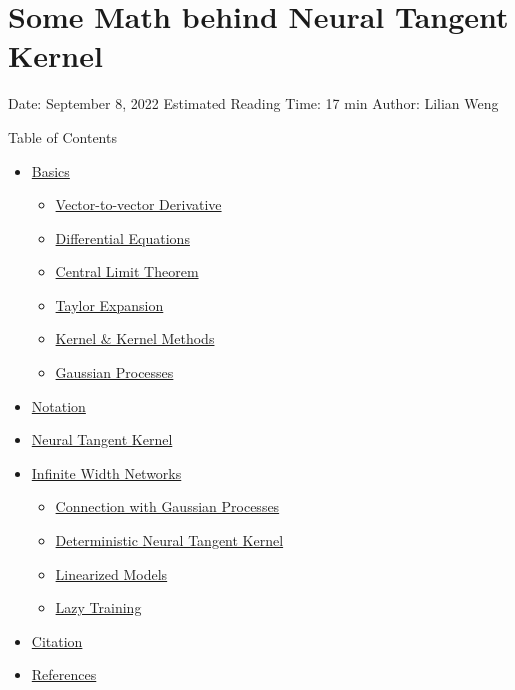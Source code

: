 \section{Some Math behind Neural Tangent Kernel}\label{some-math-behind-neural-tangent-kernel}

Date: September 8, 2022 \textbar{} Estimated Reading Time: 17 min \textbar{} Author: Lilian Weng

{Table of Contents}

\begin{itemize}
\tightlist
\item
  \hyperref[basics]{Basics}

  \begin{itemize}
  \tightlist
  \item
    \hyperref[vector-to-vector-derivative]{Vector-to-vector Derivative}
  \item
    \hyperref[differential-equations]{Differential Equations}
  \item
    \hyperref[central-limit-theorem]{Central Limit Theorem}
  \item
    \hyperref[taylor-expansion]{Taylor Expansion}
  \item
    \hyperref[kernel--kernel-methods]{Kernel \& Kernel Methods}
  \item
    \hyperref[gaussian-processes]{Gaussian Processes}
  \end{itemize}
\item
  \hyperref[notation]{Notation}
\item
  \hyperref[neural-tangent-kernel]{Neural Tangent Kernel}
\item
  \hyperref[infinite-width-networks]{Infinite Width Networks}

  \begin{itemize}
  \tightlist
  \item
    \hyperref[connection-with-gaussian-processes]{Connection with Gaussian Processes}
  \item
    \hyperref[deterministic-neural-tangent-kernel]{Deterministic Neural Tangent Kernel}
  \item
    \hyperref[linearized-models]{Linearized Models}
  \item
    \hyperref[lazy-training]{Lazy Training}
  \end{itemize}
\item
  \hyperref[citation]{Citation}
\item
  \hyperref[references]{References}
\end{itemize}

